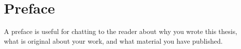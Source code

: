 \chapter*{Preface}

A preface is useful for chatting to the reader about why you wrote
this thesis, what is original about your work, and what material you
have published.

